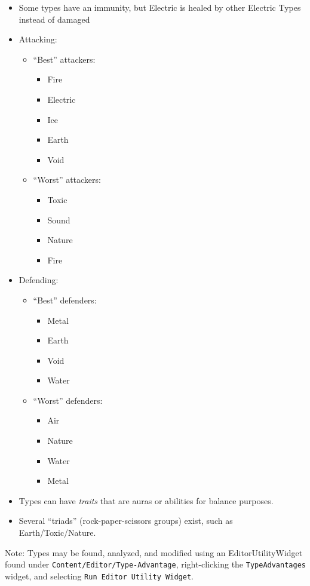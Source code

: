 

\begin{tldr}
	\begin{itemize}
		\item{Some types have an immunity, but Electric is healed by other Electric Types instead of damaged}
		\item{Attacking:
			\begin{itemize}
				\item{``Best'' attackers:
					\begin{itemize}
						\item{Fire}
						\item{Electric}
						\item{Ice}
						\item{Earth}
						\item{Void}
					\end{itemize}
				}
				\item{``Worst'' attackers:
					\begin{itemize}
						\item{Toxic}
						\item{Sound}
						\item{Nature}
						\item{Fire}
					\end{itemize}
				}
			\end{itemize}
			}
		\item{Defending:
			\begin{itemize}
				\item{``Best'' defenders:
					\begin{itemize}
						\item{Metal}
						\item{Earth}
						\item{Void}
						\item{Water}
					\end{itemize}
				}
				\item{``Worst'' defenders:
					\begin{itemize}
						\item{Air}
						\item{Nature}
						\item{Water}
						\item{Metal}
					\end{itemize}
				}
			\end{itemize}
		}
		\item{Types can have \textit{traits} that are auras or abilities for balance purposes.}
		\item{Several ``triads'' (rock-paper-scissors groups) exist, such as Earth/Toxic/Nature.}
	\end{itemize}
	Note: Types may be found, analyzed, and modified using an EditorUtilityWidget found under \texttt{Content/Editor/Type-Advantage}, right-clicking the \texttt{TypeAdvantages} widget, and selecting \texttt{Run Editor Utility Widget}.
\end{tldr}

